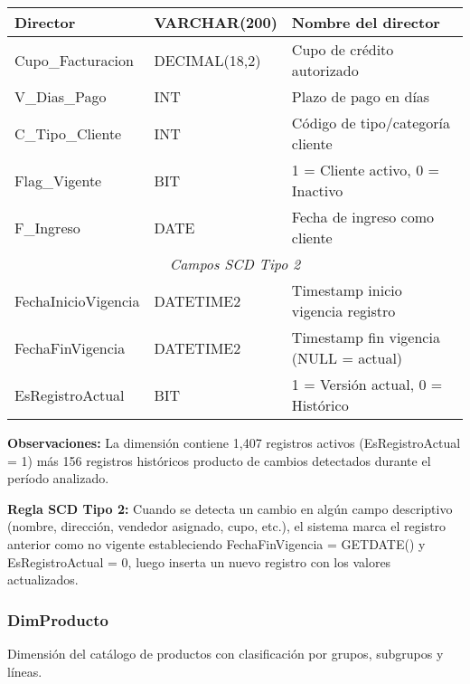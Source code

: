 \begin{longtable}{|p{4cm}|p{3cm}|p{8cm}|}
\hline
Director & VARCHAR(200) & Nombre del director \\
\hline
Cupo\_Facturacion & DECIMAL(18,2) & Cupo de crédito autorizado \\
\hline
V\_Dias\_Pago & INT & Plazo de pago en días \\
\hline
C\_Tipo\_Cliente & INT & Código de tipo/categoría cliente \\
\hline
Flag\_Vigente & BIT & 1 = Cliente activo, 0 = Inactivo \\
\hline
F\_Ingreso & DATE & Fecha de ingreso como cliente \\
\hline
\multicolumn{3}{|c|}{\textit{Campos SCD Tipo 2}} \\
\hline
FechaInicioVigencia & DATETIME2 & Timestamp inicio vigencia registro \\
\hline
FechaFinVigencia & DATETIME2 & Timestamp fin vigencia (NULL = actual) \\
\hline
EsRegistroActual & BIT & 1 = Versión actual, 0 = Histórico \\
\hline
\end{longtable}

\textbf{Observaciones:} La dimensión contiene 1,407 registros activos (EsRegistroActual = 1) más 156 registros históricos producto de cambios detectados durante el período analizado.

\textbf{Regla SCD Tipo 2:} Cuando se detecta un cambio en algún campo descriptivo (nombre, dirección, vendedor asignado, cupo, etc.), el sistema marca el registro anterior como no vigente estableciendo FechaFinVigencia = GETDATE() y EsRegistroActual = 0, luego inserta un nuevo registro con los valores actualizados.

\subsubsection{DimProducto}

Dimensión del catálogo de productos con clasificación por grupos, subgrupos y líneas.

